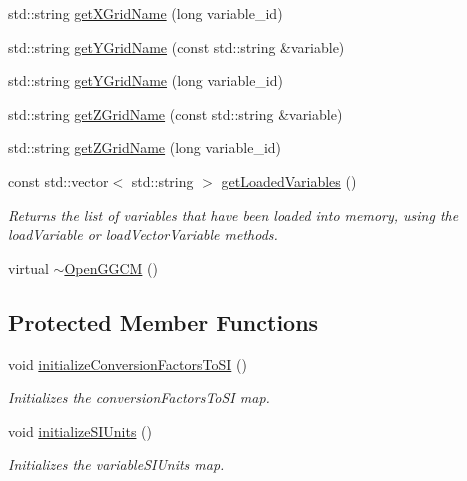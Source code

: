 \begin{DoxyCompactItemize}
\item 
std\-::string \hyperlink{classccmc_1_1_open_g_g_c_m_a9bbdc812d31153bf7529d7474a674390}{get\-X\-Grid\-Name} (long variable\-\_\-id)
\item 
std\-::string \hyperlink{classccmc_1_1_open_g_g_c_m_ae1ee82c1dccdedd15c4370895c1377e4}{get\-Y\-Grid\-Name} (const std\-::string \&variable)
\item 
std\-::string \hyperlink{classccmc_1_1_open_g_g_c_m_a96ac6043396dc00aea33d3b05cb7b29d}{get\-Y\-Grid\-Name} (long variable\-\_\-id)
\item 
std\-::string \hyperlink{classccmc_1_1_open_g_g_c_m_ab07efc9a18a869a4590c1eb3306a7f64}{get\-Z\-Grid\-Name} (const std\-::string \&variable)
\item 
std\-::string \hyperlink{classccmc_1_1_open_g_g_c_m_ae4810a6b0365259fff330e056ce92fb6}{get\-Z\-Grid\-Name} (long variable\-\_\-id)
\item 
const std\-::vector$<$ std\-::string $>$ \hyperlink{classccmc_1_1_open_g_g_c_m_a6839ad216b98e0050808abd0c08ed868}{get\-Loaded\-Variables} ()
\begin{DoxyCompactList}\small\item\em Returns the list of variables that have been loaded into memory, using the load\-Variable or load\-Vector\-Variable methods. \end{DoxyCompactList}\item 
virtual \hyperlink{classccmc_1_1_open_g_g_c_m_a840e4170a8d7dc3794bda848021168a4}{$\sim$\-Open\-G\-G\-C\-M} ()
\end{DoxyCompactItemize}
\subsection*{Protected Member Functions}
\begin{DoxyCompactItemize}
\item 
void \hyperlink{classccmc_1_1_open_g_g_c_m_ad0eab5a6039fba2eb809a3f7ab555676}{initialize\-Conversion\-Factors\-To\-S\-I} ()
\begin{DoxyCompactList}\small\item\em Initializes the conversion\-Factors\-To\-S\-I map. \end{DoxyCompactList}\item 
void \hyperlink{classccmc_1_1_open_g_g_c_m_a70edfe6a76c0f2e72ae47cae5f7e35ae}{initialize\-S\-I\-Units} ()
\begin{DoxyCompactList}\small\item\em Initializes the variable\-S\-I\-Units map. \end{DoxyCompactList}\end{DoxyCompactItemize}
